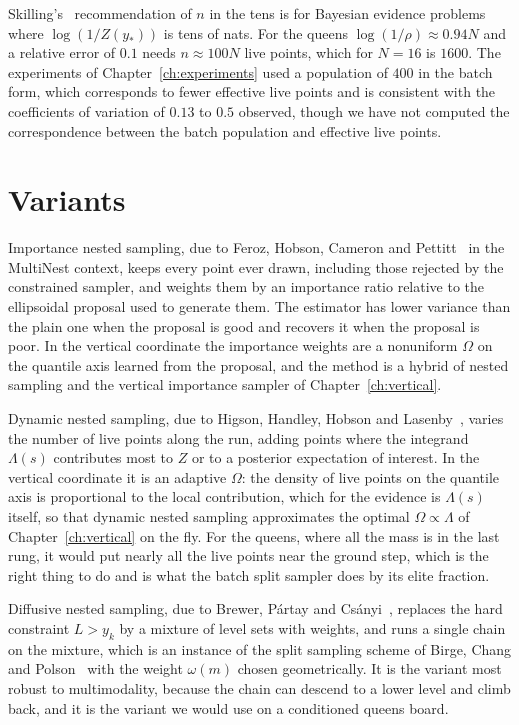 Skilling's~\cite{Skilling} recommendation of $n$ in the tens is for Bayesian evidence problems where $\log(1/Z(y_*))$ is tens of nats. For the queens $\log(1/\rho) \approx 0.94 N$ and a relative error of $0.1$ needs $n \approx 100 N$ live points, which for $N = 16$ is $1600$. The experiments of Chapter~\ref{ch:experiments} used a population of $400$ in the batch form, which corresponds to fewer effective live points and is consistent with the coefficients of variation of $0.13$ to $0.5$ observed, though we have not computed the correspondence between the batch population and effective live points.

\section{Variants}

Importance nested sampling, due to Feroz, Hobson, Cameron and Pettitt~\cite{Feroz} in the MultiNest context, keeps every point ever drawn, including those rejected by the constrained sampler, and weights them by an importance ratio relative to the ellipsoidal proposal used to generate them. The estimator has lower variance than the plain one when the proposal is good and recovers it when the proposal is poor. In the vertical coordinate the importance weights are a nonuniform $\Omega$ on the quantile axis learned from the proposal, and the method is a hybrid of nested sampling and the vertical importance sampler of Chapter~\ref{ch:vertical}.

Dynamic nested sampling, due to Higson, Handley, Hobson and Lasenby~\cite{Higson}, varies the number of live points along the run, adding points where the integrand $\Lambda(s)$ contributes most to $Z$ or to a posterior expectation of interest. In the vertical coordinate it is an adaptive $\Omega$: the density of live points on the quantile axis is proportional to the local contribution, which for the evidence is $\Lambda(s)$ itself, so that dynamic nested sampling approximates the optimal $\Omega \propto \Lambda$ of Chapter~\ref{ch:vertical} on the fly. For the queens, where all the mass is in the last rung, it would put nearly all the live points near the ground step, which is the right thing to do and is what the batch split sampler does by its elite fraction.

Diffusive nested sampling, due to Brewer, Pártay and Csányi~\cite{Brewer}, replaces the hard constraint $L > y_k$ by a mixture of level sets with weights, and runs a single chain on the mixture, which is an instance of the split sampling scheme of Birge, Chang and Polson~\cite{BCP} with the weight $\omega(m)$ chosen geometrically. It is the variant most robust to multimodality, because the chain can descend to a lower level and climb back, and it is the variant we would use on a conditioned queens board.

